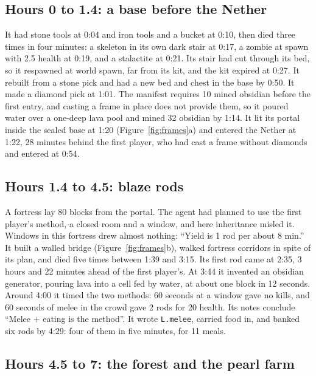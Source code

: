 \documentclass[11pt,a4paper]{article}
\begin{document}
\subsection{Hours 0 to 1.4: a base before the Nether}

It had stone tools at 0:04 and iron tools and a bucket at 0:10, then died three times in four minutes: a skeleton in its own dark stair at 0:17, a zombie at spawn with 2.5 health at 0:19, and a stalactite at 0:21. Its stair had cut through its bed, so it respawned at world spawn, far from its kit, and the kit expired at 0:27. It rebuilt from a stone pick and had a new bed and chest in the base by 0:50. It made a diamond pick at 1:01. The manifest requires 10 mined obsidian before the first entry, and casting a frame in place does not provide them, so it poured water over a one-deep lava pool and mined 32 obsidian by 1:14. It lit its portal inside the sealed base at 1:20 (Figure~\ref{fig:frames}a) and entered the Nether at 1:22, 28 minutes behind the first player, who had cast a frame without diamonds and entered at 0:54.

\subsection{Hours 1.4 to 4.5: blaze rods}

A fortress lay 80 blocks from the portal. The agent had planned to use the first player's method, a closed room and a window, and here inheritance misled it. Windows in this fortress drew almost nothing: ``Yield is 1 rod per about 8 min.'' It built a walled bridge (Figure~\ref{fig:frames}b), walked fortress corridors in spite of its plan, and died five times between 1:39 and 3:15. Its first rod came at 2:35, 3 hours and 22 minutes ahead of the first player's. At 3:44 it invented an obsidian generator, pouring lava into a cell fed by water, at about one block in 12 seconds. Around 4:00 it timed the two methods: 60 seconds at a window gave no kills, and 60 seconds of melee in the crowd gave 2 rods for 20 health. Its notes conclude ``Melee + eating is the method''. It wrote \texttt{L.melee}, carried food in, and banked six rods by 4:29: four of them in five minutes, for 11 meals.

\subsection{Hours 4.5 to 7: the forest and the pearl farm}
\end{document}
